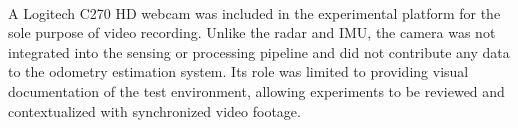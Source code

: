 \hfill
\\
\indent A Logitech C270 HD webcam was included in the experimental platform for the sole purpose of video recording.  
Unlike the radar and IMU, the camera was not integrated into the sensing or processing pipeline and did not contribute any data to the odometry estimation system.  
Its role was limited to providing visual documentation of the test environment, allowing experiments to be reviewed and contextualized with synchronized video footage.  
